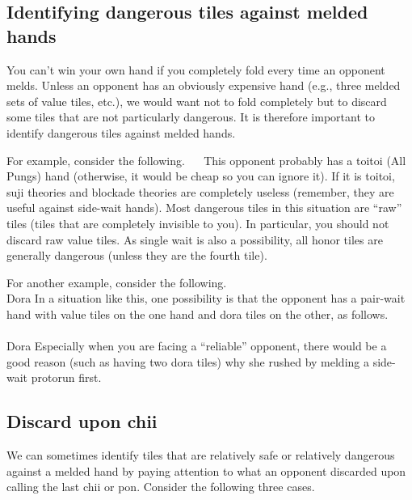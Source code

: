 {{\subsection{Identifying dangerous tiles against melded hands}

You can't win your own hand if you completely fold every time an opponent melds. Unless an opponent has an obviously expensive hand (e.g., three melded sets of value tiles, etc.), we would want not to fold completely but to discard some tiles that are not particularly dangerous. It is therefore important to identify dangerous tiles against melded hands. 

\bigskip
For example, consider the following. 
\bp
{}
\rfa\fa\fa~~
\ep
This opponent probably has a {\jap toitoi} (All Pungs) hand (otherwise, it would be cheap so you can ignore it). If it is {\jap toitoi}, {\jap suji} theories and blockade theories are completely useless (remember, they are useful against side-wait hands). 
Most dangerous tiles in this situation are ``raw'' tiles (tiles that are completely invisible to you). In particular, you should not discard raw value tiles. As single wait is also a possibility, all honor tiles are generally dangerous (unless they are the fourth tile). 

\bigskip
For another example, consider the following. 
\vspace{-10pt}
\bp
{}
~~~\\
\hspace{325pt}\footnotesize{\jap Dora}
\ep
In a situation like this, one possibility is that the opponent has a pair-wait hand with value tiles on the one hand and {\jap dora} tiles on the other, as follows. 
\bp
{}\fa\fa
~~~~\\
\hspace{325pt}\footnotesize{\jap Dora}
\ep
Especially when you are facing a ``reliable'' opponent, there would be a good reason (such as having two {\jap dora} tiles) why she rushed by melding a side-wait protorun first. 

\newpage
\subsection{Discard upon {\jap chii}}

We can sometimes identify tiles that are relatively safe or relatively dangerous against a melded hand by paying attention to what an opponent discarded upon calling the last {\jap chii} or {\jap pon}. Consider the following three cases. 

}}
